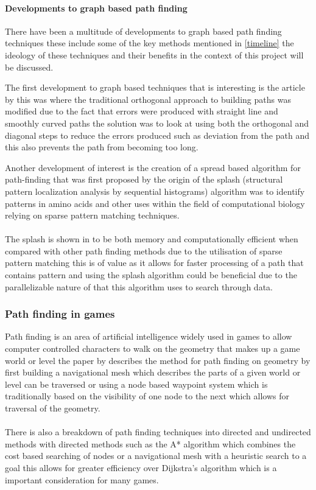 \paragraph{Developments to graph based path finding}
There have been a multitude of developments to graph based path finding techniques these include some of the key methods mentioned in \ref{timeline}  the ideology of these techniques and their benefits in the context of this project will be discussed.

The first development to graph based techniques that is interesting is the article by \cite{goodchild} this was where the traditional orthogonal approach to building paths was modified due to the fact that errors were produced with straight line and smoothly curved paths the solution was to look at using both the orthogonal and diagonal steps to reduce the errors produced such as deviation from the path and this also prevents the path from becoming too long.

Another development of interest is the creation of a spread based algorithm for path-finding that was first proposed by \cite{califano} the origin of the splash (structural pattern localization analysis by sequential histograms) algorithm was to identify patterns in amino acids and other uses within the field of computational biology relying on sparse pattern matching techniques.\\\\  The splash is shown in \cite{califano} to be both memory and computationally efficient when compared with other path finding methods due to the utilisation of sparse pattern matching this is of value as it allows for faster processing of a path that contains pattern and using the splash algorithm could be beneficial due to the parallelizable nature of that this algorithm uses to search through data.    


\subsubsection{Path finding in games}
\label{pfg}
Path finding is an area of artificial intelligence widely used in games to allow computer controlled characters to walk on the geometry that makes up a game world or level the paper by \cite{pathfinding-games} describes the method for path finding on geometry by first building a navigational mesh which describes the parts of a given world or level can be traversed or using a node based waypoint system which is traditionally based on the visibility of one node to the next which allows for traversal of the geometry.\\\\ There is also a breakdown of path finding techniques into directed and undirected methods with directed methods such as the A* algorithm which combines the cost based searching of nodes or a navigational mesh with a heuristic search to a goal this allows for greater efficiency over Dijkstra's algorithm which is a important consideration for many games.

